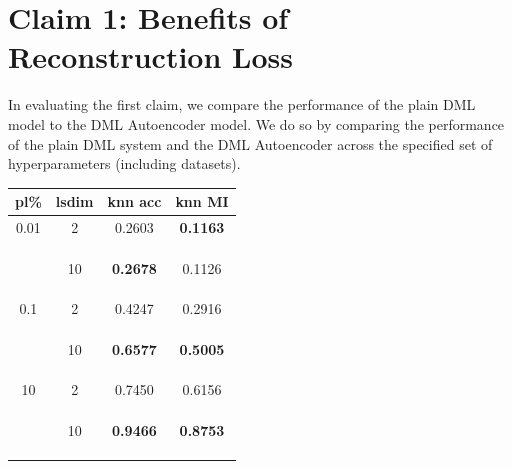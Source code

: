 \documentclass[./dissertation.tex]{subfiles}
\begin{document}
    \section{Claim 1: Benefits of Reconstruction Loss}
    In evaluating the first claim, we compare the performance of the plain DML model to the DML Autoencoder model. We do so by comparing the performance of the plain DML system and the DML Autoencoder across the specified set of hyperparameters (including datasets).
   \begin{table}[]
       \centering
       \begin{tabular}{|c|c|c|c|}
            \hline
            \textbf{pl\%} & \textbf{lsdim} & \textbf{knn acc} & \textbf{knn MI}  \\
            \hline
            0.01 & 2 & 0.2603 & \textbf{0.1163} \\
            & & & \\ 
            & & & \\ 
            & & & \\ 
            & 10 & \textbf{0.2678} & 0.1126 \\ 
            & & & \\ 
            & & & \\ 
            & & & \\ 
            0.1 & 2 & 0.4247 & 0.2916 \\
            & & & \\ 
            & & & \\ 
            & & & \\ 
            & 10 & \textbf{0.6577} & \textbf{0.5005} \\ 
            & & & \\ 
            & & & \\ 
            & & & \\
            10 & 2 & 0.7450 & 0.6156 \\
            & & & \\ 
            & & & \\ 
            & & & \\ 
            & 10 & \textbf{0.9466} & \textbf{0.8753} \\ 
            & & & \\ 
            & & & \\ 
            & & & \\
            \hline
       \end{tabular}
        \begin{tabular}{|c|c|c|c|c|}

\end{tabular}
\end{table}
\end{document}
